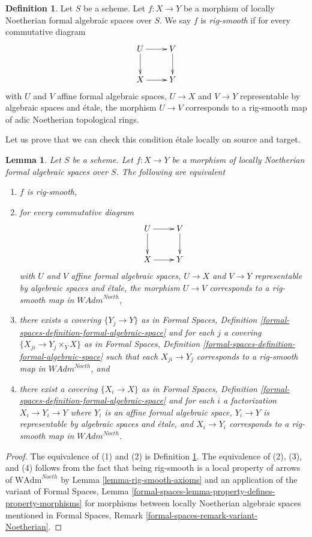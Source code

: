 \documentclass{stacks-project}
\theoremstyle{plain}
\newtheorem{lemma}[subsection]{Lemma}
\theoremstyle{definition}
\newtheorem{definition}[subsection]{Definition}
\theoremstyle{remark}
\numberwithin{equation}{subsection}
\begin{document}
\begin{definition}
\label{definition-rig-smooth}
Let $S$ be a scheme. Let $f : X \to Y$ be a morphism of locally
Noetherian formal algebraic spaces over $S$. We say $f$ is
{\it rig-smooth} if for every commutative diagram
$$
\xymatrix{
U \ar[d] \ar[r] & V \ar[d] \\
X \ar[r] & Y
}
$$
with $U$ and $V$ affine formal algebraic spaces, $U \to X$ and $V \to Y$
representable by algebraic spaces and \'etale, the morphism $U \to V$
corresponds to a rig-smooth map of adic Noetherian topological rings.
\end{definition}

\noindent
Let us prove that we can check this condition \'etale locally on
source and target.

\begin{lemma}
\label{lemma-rig-smooth-morphisms}
Let $S$ be a scheme. Let $f : X \to Y$ be a morphism of
locally Noetherian formal algebraic spaces over $S$.
The following are equivalent
\begin{enumerate}
\item $f$ is rig-smooth,
\item for every commutative diagram
$$
\xymatrix{
U \ar[d] \ar[r] & V \ar[d] \\
X \ar[r] & Y
}
$$
with $U$ and $V$ affine formal algebraic spaces, $U \to X$ and $V \to Y$
representable by algebraic spaces and \'etale, the morphism $U \to V$
corresponds to a rig-smooth map in $\textit{WAdm}^{Noeth}$,
\item there exists a covering $\{Y_j \to Y\}$ as in
Formal Spaces,
Definition \ref{formal-spaces-definition-formal-algebraic-space}
and for each $j$
a covering $\{X_{ji} \to Y_j \times_Y X\}$ as in
Formal Spaces,
Definition \ref{formal-spaces-definition-formal-algebraic-space}
such that each $X_{ji} \to Y_j$  corresponds
to a rig-smooth map in $\textit{WAdm}^{Noeth}$, and
\item there exist a covering $\{X_i \to X\}$ as in
Formal Spaces,
Definition \ref{formal-spaces-definition-formal-algebraic-space}
and for each $i$ a factorization $X_i \to Y_i \to Y$ where $Y_i$
is an affine formal algebraic space, $Y_i \to Y$ is representable
by algebraic spaces and \'etale, and $X_i \to Y_i$ corresponds
to a rig-smooth map in $\textit{WAdm}^{Noeth}$.
\end{enumerate}
\end{lemma}

\begin{proof}
The equivalence of (1) and (2) is Definition \ref{definition-rig-smooth}.
The equivalence of (2), (3), and (4) follows from the fact that
being rig-smooth is a local property of arrows of
$\text{WAdm}^{Noeth}$ by Lemma \ref{lemma-rig-smooth-axioms}
and an application of the variant of
Formal Spaces, Lemma
\ref{formal-spaces-lemma-property-defines-property-morphisms}
for morphisms between locally Noetherian algebraic spaces
mentioned in
Formal Spaces, Remark
\ref{formal-spaces-remark-variant-Noetherian}.
\end{proof}
\end{document}

